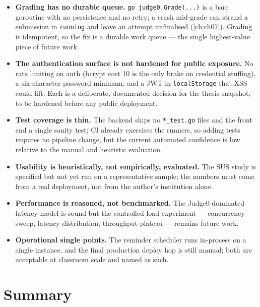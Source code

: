 \begin{itemize}[leftmargin=1.4em]
  \item \textbf{Grading has no durable queue.} \texttt{go judge0.Grade(...)} is a bare
        goroutine with no persistence and no retry; a crash mid-grade can strand a
        submission in \texttt{running} and leave an attempt unfinalised
        (\cref{ch:ch07}). Grading is idempotent, so the fix is a durable work queue ---
        the single highest-value piece of future work.
  \item \textbf{The authentication surface is not hardened for public exposure.} No
        rate limiting on auth (bcrypt cost 10 is the only brake on credential
        stuffing), a six-character password minimum, and a JWT in \texttt{localStorage}
        that XSS could lift. Each is a deliberate, documented decision for the thesis
        snapshot, to be hardened before any public deployment.
  \item \textbf{Test coverage is thin.} The backend ships no \texttt{*\_test.go}
        files and the front end a single sanity test; CI already exercises the runners,
        so adding tests requires no pipeline change, but the current automated
        confidence is low relative to the manual and heuristic evaluation.
  \item \textbf{Usability is heuristically, not empirically, evaluated.} The SUS study
        is specified but not yet run on a representative sample; the numbers must come
        from a real deployment, not from the author's institution alone.
  \item \textbf{Performance is reasoned, not benchmarked.} The Judge0-dominated latency
        model is sound but the controlled load experiment --- concurrency sweep,
        latency distribution, throughput plateau --- remains future work.
  \item \textbf{Operational single points.} The reminder scheduler runs in-process on a
        single instance, and the final production deploy hop is still manual; both are
        acceptable at classroom scale and named as such.
\end{itemize}

\section{Summary}
\label{sec:res-summary}

